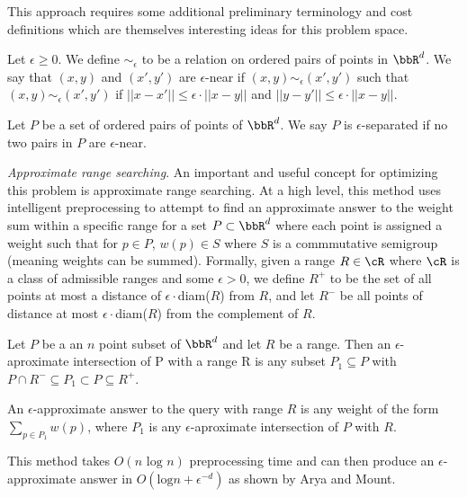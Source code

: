 This approach requires some additional preliminary terminology and cost definitions which are themselves interesting ideas for this problem space.
\begin{definition}
Let $\epsilon \geq 0$. We define $\sim_{\epsilon}$ to be a relation on ordered pairs of points in $\bbR^d$. We say that $(x,y)$ and $(x',y')$ are $\epsilon$-near if $(x,y) \sim_{\epsilon} (x', y')$ such that  $(x,y) \sim_{\epsilon} (x', y')$ if $||x-x'|| \leq \epsilon \cdot ||x-y||$ and $||y - y'|| \leq \epsilon \cdot ||x - y||$.
\end{definition}

\begin{definition}
Let $P$ be a set of ordered pairs of points of $\bbR^d$. We say $P$ is $\epsilon$-separated if no two pairs in $P$ are $\epsilon$-near.
\end{definition}

\noindent \emph{Approximate range searching}. An important and useful concept for optimizing this problem is approximate range searching. At a high level, this method uses intelligent preprocessing to attempt to find an approximate answer to the weight sum within a specific range for a set $P \subset \bbR^d$ where each point is assigned a weight such that for $p \in P$, $w(p) \in S$ where $S$ is a commmutative semigroup (meaning weights can be summed). Formally, given a range $R \in \cR$ where $\cR$ is a class of admissible ranges and some $\epsilon>0$, we define $R^+$ to be the set of all points at most a distance of $\epsilon \cdot$diam($R$) from $R$, and let $R^-$ be all points of distance at most $\epsilon \cdot$diam($R$) from the complement of $R$.

\begin{definition}
Let $P$ be a an $n$ point subset of $\bbR^d$ and let $R$ be a range. Then an $\epsilon$-aproximate intersection of P with a range R is any subset $P_1 \subseteq P$ with $P \cap R^- \subseteq P_1 \subset P \subseteq R^+$.
\end{definition}

\begin{definition}
An $\epsilon$-approximate answer to the query with range $R$ is any weight of the form $\sum_{p \in P_1} w(p)$, where $P_1$ is any $\epsilon$-aproximate intersection of $P$ with $R$.
\end{definition}

This method takes $O(n\text{ log }n)$ preprocessing time and can then produce an $\epsilon$-approximate answer in $O(\text{log}n + \epsilon^{-d})$ as shown by Arya and Mount.

